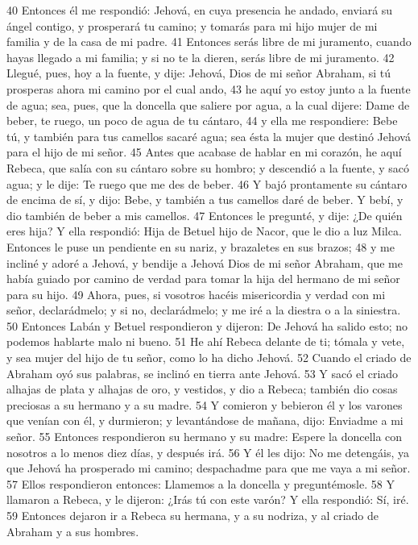 40 Entonces él me respondió: Jehová, en cuya presencia he andado, enviará su ángel contigo, y prosperará tu camino; y tomarás para mi hijo mujer de mi familia y de la casa de mi padre.
41 Entonces serás libre de mi juramento, cuando hayas llegado a mi familia; y si no te la dieren, serás libre de mi juramento.
42 Llegué, pues, hoy a la fuente, y dije: Jehová, Dios de mi señor Abraham, si tú prosperas ahora mi camino por el cual ando,
43 he aquí yo estoy junto a la fuente de agua; sea, pues, que la doncella que saliere por agua, a la cual dijere: Dame de beber, te ruego, un poco de agua de tu cántaro,
44 y ella me respondiere: Bebe tú, y también para tus camellos sacaré agua; sea ésta la mujer que destinó Jehová para el hijo de mi señor.
45 Antes que acabase de hablar en mi corazón, he aquí Rebeca, que salía con su cántaro sobre su hombro; y descendió a la fuente, y sacó agua; y le dije: Te ruego que me des de beber.
46 Y bajó prontamente su cántaro de encima de sí, y dijo: Bebe, y también a tus camellos daré de beber. Y bebí, y dio también de beber a mis camellos.
47 Entonces le pregunté, y dije: ¿De quién eres hija? Y ella respondió: Hija de Betuel hijo de Nacor, que le dio a luz Milca. Entonces le puse un pendiente en su nariz, y brazaletes en sus brazos;
48 y me incliné y adoré a Jehová, y bendije a Jehová Dios de mi señor Abraham, que me había guiado por camino de verdad para tomar la hija del hermano de mi señor para su hijo.
49 Ahora, pues, si vosotros hacéis misericordia y verdad con mi señor, declarádmelo; y si no, declarádmelo; y me iré a la diestra o a la siniestra.
50 Entonces Labán y Betuel respondieron y dijeron: De Jehová ha salido esto; no podemos hablarte malo ni bueno.
51 He ahí Rebeca delante de ti; tómala y vete, y sea mujer del hijo de tu señor, como lo ha dicho Jehová.
52 Cuando el criado de Abraham oyó sus palabras, se inclinó en tierra ante Jehová.
53 Y sacó el criado alhajas de plata y alhajas de oro, y vestidos, y dio a Rebeca; también dio cosas preciosas a su hermano y a su madre.
54 Y comieron y bebieron él y los varones que venían con él, y durmieron; y levantándose de mañana, dijo: Enviadme a mi señor.
55 Entonces respondieron su hermano y su madre: Espere la doncella con nosotros a lo menos diez días, y después irá.
56 Y él les dijo: No me detengáis, ya que Jehová ha prosperado mi camino; despachadme para que me vaya a mi señor.
57 Ellos respondieron entonces: Llamemos a la doncella y preguntémosle.
58 Y llamaron a Rebeca, y le dijeron: ¿Irás tú con este varón? Y ella respondió: Sí, iré.
59 Entonces dejaron ir a Rebeca su hermana, y a su nodriza, y al criado de Abraham y a sus hombres.
